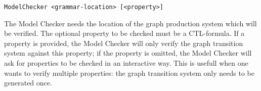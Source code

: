 \begin{verbatim}
ModelChecker <grammar-location> [<property>]
\end{verbatim}

The Model Checker needs the location of the graph production system which will be verified. The optional property to be checked must be a CTL-formula. If a property is provided, the Model Checker will only verify the graph transition system against this property; if the property is omitted, the Model Checker will ask for properties to be checked in an interactive way. This is usefull when one wants to verify multiple properties: the graph transition system only needs to be generated once.